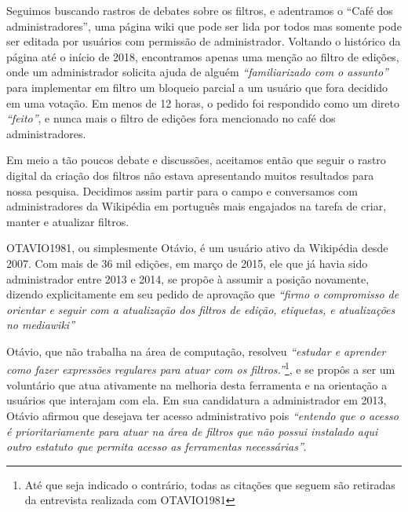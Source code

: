 Seguimos buscando rastros de debates sobre os filtros, e adentramos o ``Café dos administradores'', uma página wiki que pode ser lida por todos mas somente pode ser editada por usuários com permissão de administrador. Voltando o histórico da página até o início de 2018, encontramos apenas uma menção ao filtro de edições, onde um administrador solicita ajuda de alguém \textit{``familiarizado com o assunto''} para implementar em filtro um bloqueio parcial a um usuário que fora decidido em uma votação. Em menos de 12 horas, o pedido foi respondido como um direto \textit{``feito''}, e nunca mais o filtro de edições fora mencionado no café dos administradores. 


Em meio a tão poucos debate e discussões, aceitamos então que seguir o rastro digital da criação dos filtros não estava apresentando muitos resultados para nossa pesquisa. Decidimos assim partir para o campo e conversamos com administradores da Wikipédia em português mais engajados na tarefa de criar, manter e atualizar filtros.

OTAVIO1981, ou simplesmente Otávio, é um usuário ativo da Wikipédia desde 2007. Com mais de 36 mil edições, em março de 2015, ele que já havia sido administrador entre 2013 e 2014, se propõe à assumir a posição novamente, dizendo explicitamente em seu pedido de aprovação que \textit{``firmo o compromisso de orientar e seguir com a atualização dos filtros de edição, etiquetas, e atualizações no mediawiki''} 

Otávio, que não trabalha na área de computação, resolveu \textit{``estudar e aprender como fazer  expressões regulares para atuar com os filtros.''}\footnote{Até que seja indicado o contrário, todas as citações que seguem são retiradas da entrevista realizada com OTAVIO1981}, e se propôs a ser um voluntário que atua ativamente na melhoria desta ferramenta e na orientação a usuários que interajam com ela. Em sua candidatura a administrador em 2013, Otávio afirmou que desejava ter acesso administrativo pois \textit{``entendo que o acesso é prioritariamente para atuar na área de filtros que não possui instalado aqui outro estatuto que permita acesso as ferramentas necessárias''}.


